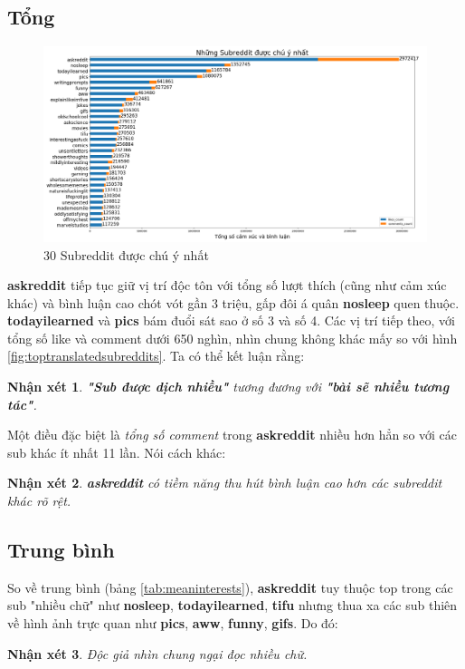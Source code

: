 \documentclass[10pt,a4paper]{article}
\newtheorem{remark}{Nhận xét}
\begin{document}
\subsection{Tổng}
\begin{figure}[!h]
    \centering
    \includegraphics[width=\textwidth]{img/TopAttentionSubreddits.png}
    \caption{30 Subreddit được chú ý nhất}
    \label{fig:topattentionsubreddits}
\end{figure}

\textbf{askreddit} tiếp tục giữ vị trí độc tôn với tổng số lượt thích (cũng như cảm xúc khác) và bình luận cao chót vót gần 3 triệu, gấp đôi á quân \textbf{nosleep} quen thuộc. \textbf{todayilearned} và \textbf{pics} bám đuổi sát sao ở số 3 và số 4. Các vị trí tiếp theo, với tổng số like và comment dưới 650 nghìn, nhìn chung không khác mấy so với hình \eqref{fig:toptranslatedsubreddits}. Ta có thể kết luận rằng:
\begin{remark}
    \label{re:attentionandtranslation}
    \textbf{"Sub được dịch nhiều"} tương đương với \textbf{"bài sẽ nhiều tương tác"}.
\end{remark}

Một điều đặc biệt là \emph{tổng số comment} trong \textbf{askreddit} nhiều hơn hẳn so với các sub khác ít nhất 11 lần. Nói cách khác:
\begin{remark}
    \label{re:askredditpotential}
    \textbf{askreddit} có tiềm năng thu hút bình luận cao hơn các subreddit khác rõ rệt.
\end{remark}
\subsection{Trung bình}
So về trung bình (bảng \eqref{tab:meaninterests}), \textbf{askreddit} tuy thuộc top trong các sub "nhiều chữ" như \textbf{nosleep}, \textbf{todayilearned}, \textbf{tifu} nhưng thua xa các sub thiên về hình ảnh trực quan như \textbf{pics}, \textbf{aww}, \textbf{funny}, \textbf{gifs}. Do đó:
\begin{remark}
    \label{re:toomuchwords}
    Độc giả nhìn chung ngại đọc nhiều chữ.
\end{remark}
\end{document}
